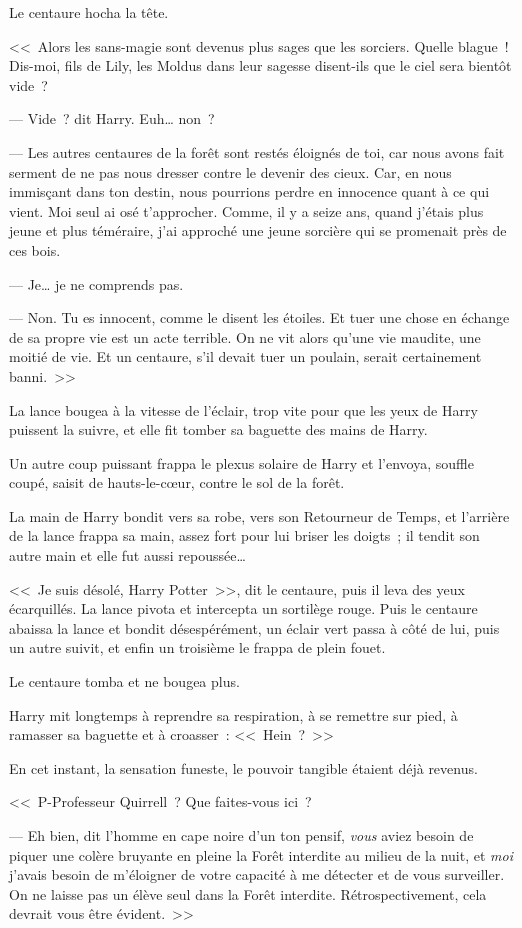 Le centaure hocha la tête.

<<~Alors les sans-magie sont devenus plus sages que les sorciers. Quelle blague~! Dis-moi, fils de Lily, les Moldus dans leur sagesse disent-ils que le ciel sera bientôt vide~?

--- Vide~? dit Harry. Euh… non~?

--- Les autres centaures de la forêt sont restés éloignés de toi, car nous avons fait serment de ne pas nous dresser contre le devenir des cieux. Car, en nous immisçant dans ton destin, nous pourrions perdre en innocence quant à ce qui vient. Moi seul ai osé t'approcher. Comme, il y a seize ans, quand j'étais plus jeune et plus téméraire, j'ai approché une jeune sorcière qui se promenait près de ces bois.

--- Je… je ne comprends pas.

--- Non. Tu es innocent, comme le disent les étoiles. Et tuer une chose en échange de sa propre vie est un acte terrible. On ne vit alors qu'une vie maudite, une moitié de vie. Et un centaure, s'il devait tuer un poulain, serait certainement banni.~>>

La lance bougea à la vitesse de l'éclair, trop vite pour que les yeux de Harry puissent la suivre, et elle fit tomber sa baguette des mains de Harry.

Un autre coup puissant frappa le plexus solaire de Harry et l'envoya, souffle coupé, saisit de hauts-le-cœur, contre le sol de la forêt.

La main de Harry bondit vers sa robe, vers son Retourneur de Temps, et l'arrière de la lance frappa sa main, assez fort pour lui briser les doigts~; il tendit son autre main et elle fut aussi repoussée…

<<~Je suis désolé, Harry Potter~>>, dit le centaure, puis il leva des yeux écarquillés. La lance pivota et intercepta un sortilège rouge. Puis le centaure abaissa la lance et bondit désespérément, un éclair vert passa à côté de lui, puis un autre suivit, et enfin un troisième le frappa de plein fouet.

Le centaure tomba et ne bougea plus.

Harry mit longtemps à reprendre sa respiration, à se remettre sur pied, à ramasser sa baguette et à croasser~: <<~Hein~?~>>

En cet instant, la sensation funeste, le pouvoir tangible étaient déjà revenus.

<<~P-Professeur Quirrell~? Que faites-vous ici~?

--- Eh bien, dit l'homme en cape noire d'un ton pensif, \emph{vous} aviez besoin de piquer une colère bruyante en pleine la Forêt interdite au milieu de la nuit, et \emph{moi} j'avais besoin de m'éloigner de votre capacité à me détecter et de vous surveiller. On ne laisse pas un élève seul dans la Forêt interdite. Rétrospectivement, cela devrait vous être évident.~>>

